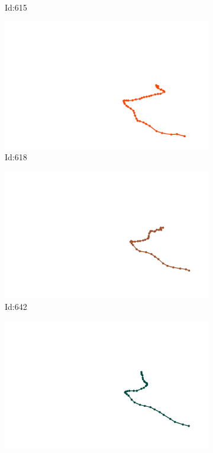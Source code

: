 \documentclass[12pt,twoside]{report}
\begin{document}
\begin{figure}
\begin{subfigure}[b]{0.20\textwidth}
\caption{Id:615}
\end{subfigure}
\begin{subfigure}[b]{0.20\textwidth}
\centering
\includegraphics[width=\textwidth]{../trajectories/618.png}
\caption{Id:618}
\end{subfigure}
\begin{subfigure}[b]{0.20\textwidth}
\centering
\includegraphics[width=\textwidth]{../trajectories/642.png}
\caption{Id:642}
\end{subfigure}
\begin{subfigure}[b]{0.20\textwidth}
\centering
\includegraphics[width=\textwidth]{../trajectories/643.png}

\end{subfigure}
\end{figure}
\end{document}
